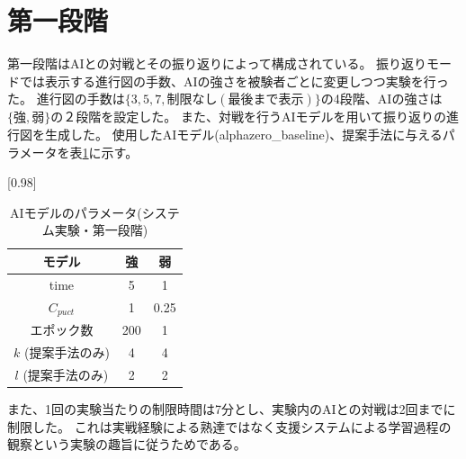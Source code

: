 \section{第一段階}
第一段階はAIとの対戦とその振り返りによって構成されている。
振り返りモードでは表示する進行図の手数、AIの強さを被験者ごとに変更しつつ実験を行った。
進行図の手数は$\{3, 5, 7, 制限なし(最後まで表示)\}$の4段階、AIの強さは$\{強,弱\}$の２段階を設定した。
また、対戦を行うAIモデルを用いて振り返りの進行図を生成した。
使用したAIモデル(alphazero\_baseline)、提案手法に与えるパラメータを表\ref{table:param-system}に示す。
\begin{table}[H]
	\caption{AIモデルのパラメータ(システム実験・第一段階)}
    \label{table:param-system}
	\centering
	\scalebox{0.98}[0.98]{
		\begin{tabular}{c|c|c}
			モデル&強&弱\\\hline
			time    & 5 & 1 \\ 
			$C_{puct}$ & 1   & 0.25 \\
            エポック数 & 200 & 1 \\
			$k$ (提案手法のみ)     & 4 & 4 \\
			$l$ (提案手法のみ)     & 2 & 2 \\

		\end{tabular}
	}
	
\end{table}
また、1回の実験当たりの制限時間は7分とし、実験内のAIとの対戦は2回までに制限した。
これは実戦経験による熟達ではなく支援システムによる学習過程の観察という実験の趣旨に従うためである。
